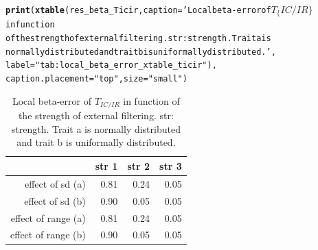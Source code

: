 \documentclass[12pt]{article}\usepackage[]{graphicx}\usepackage[]{color}
\makeatletter
\newcommand{\hlstr}[1]{\textcolor[rgb]{0.192,0.494,0.8}{#1}}%
\newcommand{\hlstd}[1]{\textcolor[rgb]{0.345,0.345,0.345}{#1}}%
\newcommand{\hlkwc}[1]{\textcolor[rgb]{0.333,0.667,0.333}{#1}}%
\newcommand{\hlkwd}[1]{\textcolor[rgb]{0.737,0.353,0.396}{\textbf{#1}}}%
\newenvironment{kframe}{%
 \def\at@end@of@kframe{}%
 \ifinner\ifhmode%
  \def\at@end@of@kframe{\end{minipage}}%
  \begin{minipage}{\columnwidth}%
 \fi\fi%
 \def\FrameCommand##1{\hskip\@totalleftmargin \hskip-\fboxsep
 \colorbox{shadecolor}{##1}\hskip-\fboxsep
     \hskip-\linewidth \hskip-\@totalleftmargin \hskip\columnwidth}%
 \MakeFramed {\advance\hsize-\width
   \@totalleftmargin\z@ \linewidth\hsize
   \@setminipage}}%
 {\par\unskip\endMakeFramed%
 \at@end@of@kframe}
\makeatother
\begin{document}
\begin{kframe}
\begin{alltt}
\hlkwd{print}\hlstd{(}\hlkwd{xtable}\hlstd{(res_beta_Ticir,} \hlkwc{caption} \hlstd{=} \hlstr{'Local beta-error of $T_\{IC/IR\}$ in function 
             of the strength of external filtering. str: strength. Trait a is 
             normally distributed and trait b is uniformally distributed.'}\hlstd{,}
             \hlkwc{label} \hlstd{=} \hlstr{"tab:local_beta_error_xtable_ticir"}\hlstd{),}
      \hlkwc{caption.placement} \hlstd{=} \hlstr{"top"}\hlstd{,} \hlkwc{size} \hlstd{=} \hlstr{"small"}\hlstd{)}
\end{alltt}
\end{kframe}%
\begin{table}[ht]
\centering
\caption{Local beta-error of $T_{IC/IR}$ in function 
             of the strength of external filtering. str: strength. Trait a is 
             normally distributed and trait b is uniformally distributed.} 
\label{tab:local_beta_error_xtable_ticir}
{\small
\begin{tabular}{rrrr}
  \hline
 & str 1 & str 2 & str 3 \\ 
  \hline
effect of sd (a) & 0.81 & 0.24 & 0.05 \\ 
  effect of sd (b) & 0.90 & 0.05 & 0.05 \\ 
  effect of range (a) & 0.81 & 0.24 & 0.05 \\ 
  effect of range (b) & 0.90 & 0.05 & 0.05 \\ 
   \hline
\end{tabular}
}
\end{table}
\end{document}
